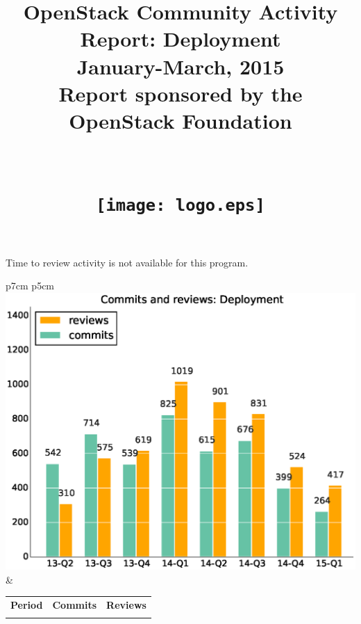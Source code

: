 \documentclass[a4wide,11pt]{article}
\begin{document}
\title{OpenStack Community Activity Report: Deployment\\
      January-March, 2015 \\
      Report sponsored by the OpenStack Foundation\\
        ~~\\~~\\  \texttt{[image: logo.eps]}       \\}




\maketitle

\newpage


Time to review activity is not available for this program.\\



\begin{tabular}{p{7cm} p{5cm}}
    \vspace{0pt} 
    \includegraphics[scale=.35]{figs/commitsDeployment.eps}
    & 
    \vspace{0pt}
    \begin{tabular}{l|r|r|}%
    \bfseries Period & \bfseries Commits & \bfseries Reviews %
    \csvreader[head to column names]{data/commitsDeployment.csv}{}%
    {\\ & \commits & \submitted}
    \end{tabular}
\end{tabular}
\end{document}
